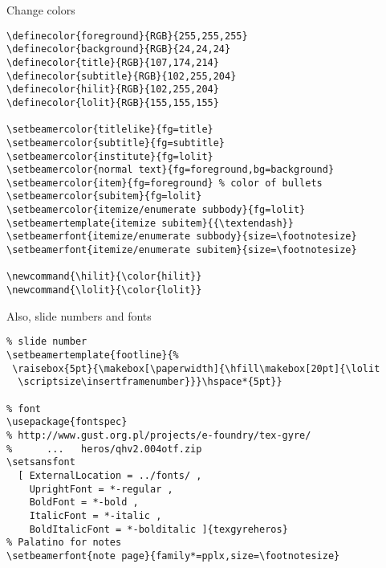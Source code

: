 \documentclass[12pt,t]{beamer}
\begin{document}
\begin{frame}[c,fragile]{Change colors}

\begin{lstlisting}
\definecolor{foreground}{RGB}{255,255,255}
\definecolor{background}{RGB}{24,24,24}
\definecolor{title}{RGB}{107,174,214}
\definecolor{subtitle}{RGB}{102,255,204}
\definecolor{hilit}{RGB}{102,255,204}
\definecolor{lolit}{RGB}{155,155,155}

\setbeamercolor{titlelike}{fg=title}
\setbeamercolor{subtitle}{fg=subtitle}
\setbeamercolor{institute}{fg=lolit}
\setbeamercolor{normal text}{fg=foreground,bg=background}
\setbeamercolor{item}{fg=foreground} % color of bullets
\setbeamercolor{subitem}{fg=lolit}
\setbeamercolor{itemize/enumerate subbody}{fg=lolit}
\setbeamertemplate{itemize subitem}{{\textendash}}
\setbeamerfont{itemize/enumerate subbody}{size=\footnotesize}
\setbeamerfont{itemize/enumerate subitem}{size=\footnotesize}

\newcommand{\hilit}{\color{hilit}}
\newcommand{\lolit}{\color{lolit}}
\end{lstlisting}

\end{frame}

\begin{frame}[c,fragile]{Also, slide numbers and fonts}

\begin{lstlisting}
% slide number
\setbeamertemplate{footline}{%
 \raisebox{5pt}{\makebox[\paperwidth]{\hfill\makebox[20pt]{\lolit
  \scriptsize\insertframenumber}}}\hspace*{5pt}}

% font
\usepackage{fontspec}
% http://www.gust.org.pl/projects/e-foundry/tex-gyre/
%      ...   heros/qhv2.004otf.zip
\setsansfont
  [ ExternalLocation = ../fonts/ ,
    UprightFont = *-regular ,
    BoldFont = *-bold ,
    ItalicFont = *-italic ,
    BoldItalicFont = *-bolditalic ]{texgyreheros}
% Palatino for notes
\setbeamerfont{note page}{family*=pplx,size=\footnotesize}
\end{lstlisting}

\end{frame}
\end{document}
